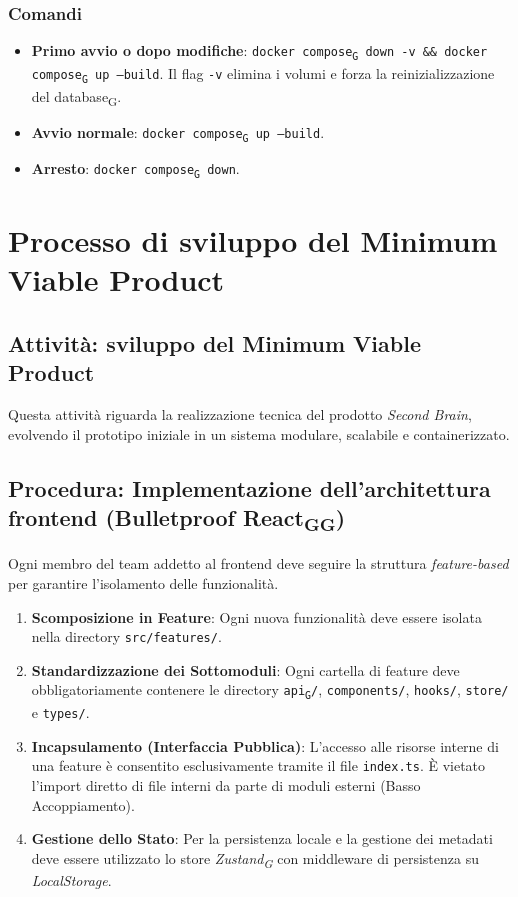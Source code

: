 \documentclass[11pt,a4paper]{article}
\newcommand{\gls}[1]{#1\textsubscript{G}}
\begin{document}
\subsubsection{Comandi}
 
\begin{itemize}
    \item \textbf{Primo avvio o dopo modifiche}: \texttt{\gls{docker compose} down -v \&\& \gls{docker compose} up --build}. Il flag \texttt{-v} elimina i volumi e forza la reinizializzazione del \gls{database}.
    \item \textbf{Avvio normale}: \texttt{\gls{docker compose} up --build}.
    \item \textbf{Arresto}: \texttt{\gls{docker compose} down}.
\end{itemize}

\newpage

\section{Processo di sviluppo del Minimum Viable Product}
\subsection{Attività: sviluppo del Minimum Viable Product}
Questa attività riguarda la realizzazione tecnica del prodotto \textit{Second Brain}, evolvendo il prototipo iniziale in un sistema modulare, scalabile e containerizzato.

\subsection{Procedura: Implementazione dell'architettura frontend (\gls{Bulletproof \gls{React}})}
Ogni membro del team addetto al frontend deve seguire la struttura \textit{feature-based} per garantire l'isolamento delle funzionalità.
\begin{enumerate}
    \item \textbf{Scomposizione in Feature}: Ogni nuova funzionalità deve essere isolata nella directory \texttt{src/features/}.
    \item \textbf{Standardizzazione dei Sottomoduli}: Ogni cartella di feature deve obbligatoriamente contenere le directory \texttt{\gls{api}/}, \texttt{components/}, \texttt{hooks/}, \texttt{store/} e \texttt{types/}.
    \item \textbf{Incapsulamento (Interfaccia Pubblica)}: L'accesso alle risorse interne di una feature è consentito esclusivamente tramite il file \texttt{index.ts}. È vietato l'import diretto di file interni da parte di moduli esterni (Basso Accoppiamento).
    \item \textbf{Gestione dello Stato}: Per la persistenza locale e la gestione dei metadati deve essere utilizzato lo store \textit{\gls{Zustand}} con middleware di persistenza su \textit{LocalStorage}.
\end{enumerate}
\end{document}

